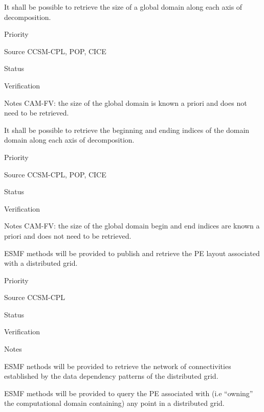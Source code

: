 

It shall be possible to retrieve the size of a global domain
along each axis of decomposition.

\begin{reqlist}
\item[Priority]
\item[Source] CCSM-CPL, POP, CICE
\item[Status]
\item[Verification]
\item[Notes] CAM-FV: the size of the global domain is known
a priori and does not need to be retrieved.
\end{reqlist}


It shall be possible to retrieve the beginning and ending indices of the
domain domain along each axis of decomposition.

\begin{reqlist}
\item[Priority]
\item[Source] CCSM-CPL, POP, CICE
\item[Status]
\item[Verification]
\item[Notes] CAM-FV: the size of the global domain begin and end
indices are known a priori and does not need to be retrieved.
\end{reqlist}


ESMF methods will be provided to publish and retrieve the PE layout
associated with a distributed grid.

\begin{reqlist}
\item[Priority]
\item[Source] CCSM-CPL
\item[Status]
\item[Verification]
\item[Notes]
\end{reqlist}


ESMF nethods will be provided to retrieve the network of
connectivities established by the data dependency patterns of the
distributed grid.


ESMF methods will be provided to query the PE associated with (i.e
``owning'' the computational domain containing) any point in a
distributed grid.

